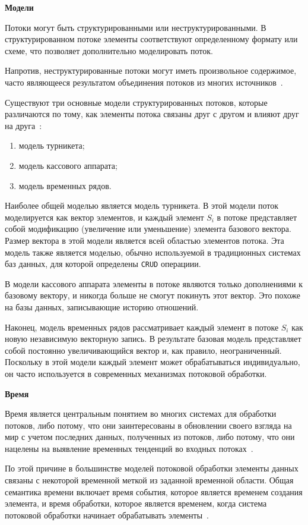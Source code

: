 \textbf{Модели}

Потоки могут быть структурированными или неструктурированными. 
В структурированном потоке элементы соответствуют определенному формату или схеме, что позволяет дополнительно моделировать поток. 

Напротив, неструктурированные потоки могут иметь произвольное содержимое, часто являющееся результатом объединения потоков из многих источников~\cite{10.1007/978-3-642-53974-9_6}.

Существуют три основные модели структурированных потоков, которые различаются по тому, как элементы потока связаны друг с другом и влияют друг на друга~\cite{stream-def}: 
\begin{enumerate}
  \item модель турникета;
  \item модель кассового аппарата; 
  \item модель временных рядов. 
\end{enumerate}

Наиболее общей моделью является модель турникета. 
В этой модели поток моделируется как вектор элементов, и каждый элемент $S_{i}$ в потоке представляет собой модификацию (увеличение или уменьшение) элемента базового вектора. 
Размер вектора в этой модели является всей областью элементов потока. 
Эта модель также является моделью, обычно используемой в традиционных системах баз данных, для которой определены \texttt{CRUD} операциии. 

В модели кассового аппарата элементы в потоке являются только дополнениями к базовому вектору, и никогда больше не смогут покинуть этот вектор. 
Это похоже на базы данных, записывающие историю отношений. 

Наконец, модель временных рядов рассматривает каждый элемент в потоке $S_{i}$ как новую независимую векторную запись. 
В результате базовая модель представляет собой постоянно увеличивающийся вектор и, как правило, неограниченный. 
Поскольку в этой модели каждый элемент может обрабатываться индивидуально, он часто используется в современных механизмах потоковой обработки.

\textbf{Время}

Время является центральным понятием во многих системах для обработки потоков, либо потому, что они заинтересованы в обновлении своего взгляда на мир с учетом последних данных, полученных из потоков, либо потому, что они нацелены на выявление временных тенденций во входных потоках~\cite{stream-def}. 

По этой причине в большинстве моделей потоковой обработки элементы данных связаны с некоторой временной меткой из заданной временной области. 
Общая семантика времени включает время события, которое является временем создания элемента, и время обработки, которое является временем, когда система потоковой обработки начинает обрабатывать элементы~\cite{10.14778/2824032.2824076}.

